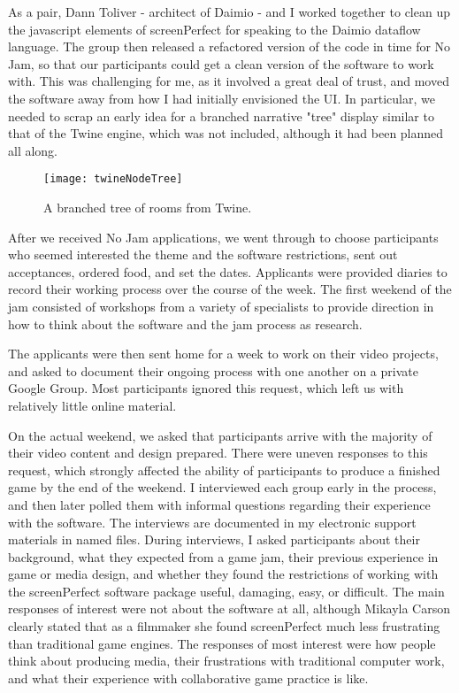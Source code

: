 As a pair, Dann Toliver - architect of Daimio - and I worked together to clean up the javascript elements of screenPerfect for speaking to the Daimio dataflow language. The group then released a refactored version of the code in time for No Jam, so that our participants could get a clean version of the software to work with. This was challenging for me, as it involved a great deal of trust, and moved the software away from how I had initially envisioned the UI. In particular, we needed to scrap an early idea for a branched narrative "tree" display similar to that of the Twine engine, which was not included, although it had been planned all along.


\newpage
\begin{figure}[h!]
 \centering
 \texttt{[image: twineNodeTree]}
 \caption{A branched tree of rooms from Twine.}
\end{figure}
\newpage

After we received No Jam applications, we went through to choose participants who seemed interested the theme and the software restrictions, sent out acceptances, ordered food, and set the dates. Applicants were provided diaries to record their working process over the course of the week. The first weekend of the jam consisted of workshops from a variety of specialists to provide direction in how to think about the software and the jam process as research.

The applicants were then sent home for a week to work on their video projects, and asked to document their ongoing process with one another on a private Google Group. Most participants ignored this request, which left us with relatively little online material.

On the actual weekend, we asked that participants arrive with the majority of their video content and design prepared. There were uneven responses to this request, which strongly affected the ability of participants to produce a finished game by the end of the weekend. I interviewed each group early in the process, and then later polled them with informal questions regarding their experience with the software. The interviews are documented in my electronic support materials in named files. During interviews, I asked participants about their background, what they expected from a game jam, their previous experience in game or media design, and whether they found the restrictions of working with the screenPerfect software package useful, damaging, easy, or difficult. The main responses of interest were not about the software at all, although Mikayla Carson clearly stated that as a filmmaker she found screenPerfect much less frustrating than traditional game engines. The responses of most interest were how people think about producing media, their frustrations with traditional computer work, and what their experience with collaborative game practice is like.

